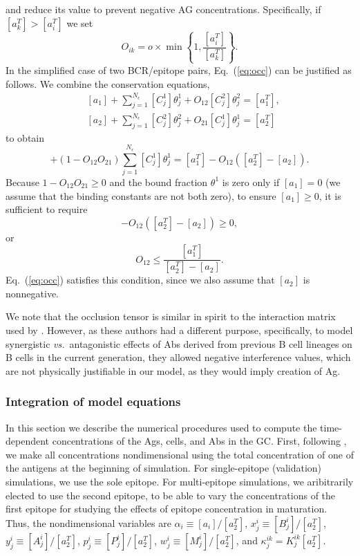 \documentclass[utf8]{frontiersHLTH}%
\newcommand{\cred}[1]{\textsf{\color{red}#1}}
\def\vs {{\it vs.}}
\newcommand{\eq}[1] {Eq.~(\ref{eq:#1})}
\begin{document}
and reduce its value to prevent negative AG concentrations.
Specifically, if $[a^T_k]>[a^T_i]$ we set
\begin{equation}
 O_{ik} = o \times \min\left\{1,\frac{[a^T_i]}{[a^T_k]}\right\}.
 \label{eq:occ}
\end{equation}
In the simplified case of two BCR/epitope pairs, \eq{occ} can be justified as follows.
We combine the conservation equations,
\begin{equation}
 \begin{aligned}
 &[a_1] + \sum^{N_\epsilon}_{j=1} [C^1_j]\theta^1_j + O_{12}[C^2_j]\theta^2_j =[a^T_1],\\
 &[a_2] + \sum^{N_\epsilon}_{j=1} [C^2_j]\theta^2_j + O_{21}[C^1_j]\theta^1_j =[a^T_2]
 \end{aligned}
 \label{eq:ag4}
\end{equation}
to obtain
\begin{equation}
 [a_1] + (1-O_{12}O_{21})\sum^{N_\epsilon}_{j=1} [C^1_j]\theta^1_j = [a^T_1] - O_{12}([a^T_2] - [a_2]).
 \label{eq:ag5}
\end{equation}
Because $1-O_{12}O_{21}\ge0$ and the bound fraction $\theta^1$ is zero only if $[a_1]=0$ (we assume that the binding constants
are not both zero), to ensure $[a_1]\ge0$, it is sufficient to require
\begin{equation}
 [a^T_1] - O_{12}([a^T_2] - [a_2])\ge0,
 \label{eq:ag6}
\end{equation}
or
\begin{equation}
 O_{12}\le\frac{[a^T_1]}{[a^T_2] - [a_2]}.
 \label{eq:ag7}
\end{equation}
\eq{occ} satisfies this condition, since we also assume that $[a_2]$ is nonnegative.

\cred{We note that the occlusion tensor is similar in spirit to the interaction
matrix used by \citet{Yan20}. However, as these authors had a different
purpose, specifically, to model synergistic \vs~antagonistic effects of
Abs derived from previous B cell lineages on B cells in the current
generation, they allowed negative interference values, which are not
physically justifiable in our model, as they would imply creation of Ag.}




\subsubsection{Integration of model equations}
\label{sec:integration}
In this section we describe the numerical procedures used to compute the
time-dependent concentrations of the Ags, cells, and Abs in the GC.
First, following \citet{kepler93}, we make all concentrations
nondimensional using the total concentration of one of the antigens at the beginning of simulation.
For single-epitope (validation) simulations, we use the sole epitope.
For multi-epitope simulations, we aribitrarily elected to use the second epitope,
to be able to vary the concentrations of the first epitope for
studying the effects of epitope concentration in maturation.
Thus, the nondimensional variables are
$\alpha_i\equiv[a_i]/[a_2^T]$, $x^i_j\equiv[B^i_j]/[a_2^T]$,
$y^i_j\equiv[A^i_j]/[a_2^T]$,
$p^i_j\equiv[P^i_j]/[a_2^T]$, $w^i_j\equiv[M^i_j]/[a_2^T]$, and
$\kappa^{ik}_j=K^{ik}_j[a_2^T]$.
\end{document}

